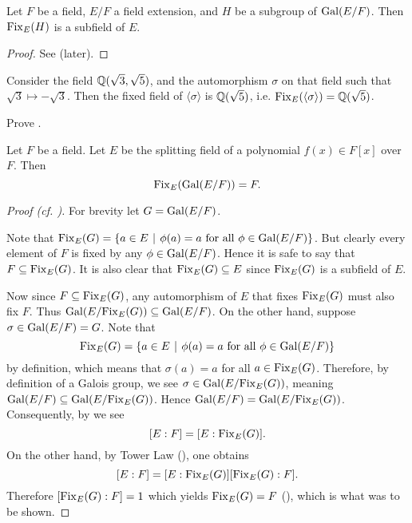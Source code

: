 \begin{proposition}\label{prop-fixed-field-is-subfield}
    Let $F$ be a field, $E/F$ a field extension, and $H$ be a subgroup of $\mathrm{Gal}(E/F)$. Then $\mathrm{Fix}_{E}(H)$ is a subfield of $E$.
\end{proposition}
\begin{proof}
    See  (later).
\end{proof}

\begin{example}
    Consider the field $\mathbb{Q}(\sqrt3,\sqrt5)$, and the automorphism $\sigma$ on that field such that $\sqrt3 \mapsto -\sqrt3$. Then the fixed field of $\langle\sigma\rangle$ is $\mathbb{Q}(\sqrt5)$, i.e. $\mathrm{Fix}_{E}(\langle\sigma\rangle) = \mathbb{Q}(\sqrt5)$.
\end{example}

\begin{exercise}\label{exercise-fixed-field-is-subfield}
    Prove .
\end{exercise}

\begin{proposition}\label{prop-fixed-field-of-Gal-E/F-is-F}
    Let $F$ be a field. Let $E$ be the splitting field of a polynomial $f(x) \in F[x]$ over $F$. Then
    \[
        \mathrm{Fix}_{E}(\mathrm{Gal}(E/F)) = F.
    \]
\end{proposition}
\begin{proof}[Proof (cf. {\cite[Proposition 23.17]{judson_beezer_2022}})]
    For brevity let $G = \mathrm{Gal}(E/F)$.
    
    Note that $\Fix{E}{G} = \{a \in E \vert \phi(a) = a \text{ for all } \phi \in \Gal{E/F}\}$. But clearly every element of $F$ is fixed by any $\phi \in \mathrm{Gal}(E/F)$. Hence it is safe to say that $F \subseteq \mathrm{Fix}_{E}(G)$. It is also clear that $\mathrm{Fix}_{E}(G) \subseteq E$ since $\mathrm{Fix}_{E}(G)$ is a subfield of $E$.

    Now since $F \subseteq \mathrm{Fix}_{E}(G)$, any automorphism of $E$ that fixes $\mathrm{Fix}_{E}(G)$ must also fix $F$. Thus $\mathrm{Gal}(E/\mathrm{Fix}_{E}(G)) \subseteq \mathrm{Gal}(E/F)$. On the other hand, suppose $\sigma \in \mathrm{Gal}(E/F) = G$. Note that
    \[
        \Fix{E}{G} = \{a \in E \vert \phi(a) = a \text{ for all } \phi \in \Gal{E/F}\}
    \]
    by definition, which means that $\sigma(a) = a$ for all $a \in \mathrm{Fix}_{E}(G)$. Therefore, by definition of a Galois group, we see $\sigma \in \mathrm{Gal}(E/\mathrm{Fix}_{E}(G))$, meaning $\mathrm{Gal}(E/F) \subseteq \mathrm{Gal}(E/\mathrm{Fix}_{E}(G))$. Hence $\mathrm{Gal}(E/F) = \mathrm{Gal}(E/\mathrm{Fix}_{E}(G))$. Consequently, by  we see
    \[
        [E:F] = [E:\mathrm{Fix}_{E}(G)].
    \]
    On the other hand, by Tower Law (), one obtains
    \[
        [E:F] = [E:\mathrm{Fix}_{E}(G)][\mathrm{Fix}_{E}(G):F].
    \]
    Therefore $[\mathrm{Fix}_{E}(G):F] = 1$ which yields $\mathrm{Fix}_{E}(G) = F$ (), which is what was to be shown.
\end{proof}

